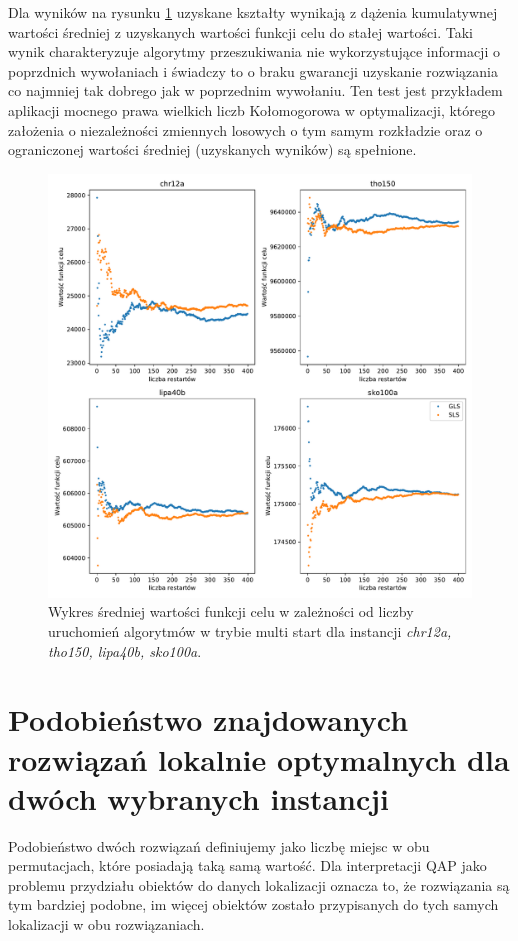 \documentclass{article}
\begin{document}
Dla wyników na rysunku \ref{fig:quality_mean} uzyskane kształty wynikają z dążenia kumulatywnej wartości średniej z uzyskanych wartości funkcji celu do stałej wartości. Taki wynik charakteryzuje algorytmy przeszukiwania nie wykorzystujące informacji o poprzdnich wywołaniach i świadczy to o braku gwarancji uzyskanie rozwiązania co najmniej tak dobrego jak w poprzednim wywołaniu. Ten test jest przykładem aplikacji mocnego prawa wielkich liczb Kołomogorowa w optymalizacji, którego założenia o niezależności zmiennych losowych o tym samym rozkładzie oraz o ograniczonej wartości średniej (uzyskanych wyników) są spełnione.

\begin{figure}[H]
	\centering
	\includegraphics[width=\linewidth]{figs/mean_acc_end_obj_val.pdf}
	\caption{Wykres średniej wartości funkcji celu w zależności od liczby uruchomień algorytmów w trybie multi start dla instancji \textit{chr12a, tho150, lipa40b, sko100a}.}
	\label{fig:quality_mean}
\end{figure}

\section{Podobieństwo znajdowanych rozwiązań lokalnie optymalnych dla dwóch wybranych instancji}
Podobieństwo dwóch rozwiązań definiujemy jako liczbę miejsc w obu permutacjach, które posiadają taką samą wartość. Dla interpretacji QAP jako problemu przydziału obiektów do danych lokalizacji oznacza to, że rozwiązania są tym bardziej podobne, im więcej obiektów zostało przypisanych do tych samych lokalizacji w obu rozwiązaniach.
\end{document}
